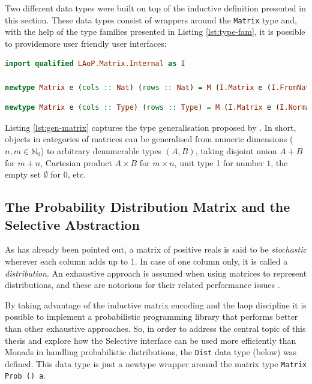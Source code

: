 \documentclass[
  oneside,
  11pt, a4paper,
  footinclude=true,
  headinclude=true,
  cleardoublepage=empty
]{scrbook}
\theoremstyle{definition}
\theoremstyle{definition}
\begin{document}
        Two different data types were built on top of the inductive definition presented in this section. These data types consist of wrappers around the \texttt{Matrix} type and, with the help of the type families presented in Listing \ref{lst:type-fam}, it is possible to providemore user friendly user interfaces:
        
        \begin{lstlisting}[language=Haskell, caption={Dimensions are type level naturals},captionpos=b]
import qualified LAoP.Matrix.Internal as I

newtype Matrix e (cols :: Nat) (rows :: Nat) = M (I.Matrix e (I.FromNat cols) (I.FromNat rows))
        \end{lstlisting}
        
        \begin{lstlisting}[language=Haskell, caption={Dimensions are arbitrary data types},captionpos=b, label={lst:gen-matrix}]
newtype Matrix e (cols :: Type) (rows :: Type) = M (I.Matrix e (I.Normalize cols) (I.Normalize rows))
        \end{lstlisting}
        
        Listing \ref{lst:gen-matrix} captures the type generalisation proposed by \cite{oliveira2012towards}. In short, objects in categories of matrices can be generalised from numeric dimensions ($n, m \in \mathbb{N}_0$) to arbitrary denumerable types $(A,B)$, taking disjoint union $A + B$ for $m + n$, Cartesian product $A \times B$ for $m \times n$, unit type 1 for number $1$, the empty set $\emptyset$ for $0$, etc.
        
        \subsection{The Probability Distribution Matrix and the Selective Abstraction}
        
         As has already been pointed out, a matrix of positive reals is said to be \emph{stochastic} wherever each column adds up to 1. In case of one column only, it is called a \emph{distribution}. An exhaustive approach is assumed when using matrices to represent distributions, and these are notorious for their related performance issues \citep{Scibior:2015:PPP:2887747.2804317, kidd2007build}.
         
         By taking advantage of the inductive matrix encoding and the \gls{laop} discipline it is possible to implement a probabilistic programming library that performs better than other exhaustive approaches. So, in order to address the central topic of this thesis and explore how the Selective interface can be used more efficiently than Monads in handling probabilistic distributions, the \texttt{Dist} data type (below) was defined. This data type is just a newtype wrapper around the matrix type \texttt{Matrix Prob () a}.
        
\end{document}
